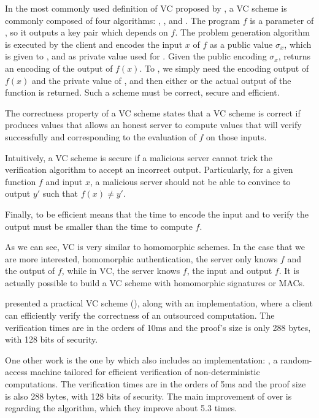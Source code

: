 In the most commonly used definition of VC proposed by
\textcite{eprint:2009:547}, a VC scheme is commonly composed of four
algorithms: \KeyGen, ,  and
. The program $f$ is a parameter of \KeyGen, so it outputs
a key pair which depends on $f$.  The problem generation algorithm
 is executed by the client and encodes the input $x$ of $f$
as a public value $\sigma_x$, which is given to , and as
private value used for .  Given the public encoding
$\sigma_x$,  returns an encoding of the output of $f(x)$. To
, we simply need the encoding output of $f(x)$ and the
private value of , and then either  or the
actual output of the function is returned. Such a scheme must be correct,
secure and efficient.

The correctness property of a VC scheme states that a VC scheme is correct if
 produces values that allows an honest server to compute
values that will verify successfully and corresponding to the evaluation of $f$
on those inputs.

Intuitively, a VC scheme is secure if a malicious server cannot trick the
verification algorithm to accept an incorrect output. Particularly, for a given
function $f$ and input $x$, a malicious server should not be able to convince
 to output $y'$ such that $f(x) \neq y'$.

Finally, to be efficient means that the time to encode the input and to verify
the output must be smaller than the time to compute $f$.

As we can see, VC is very similar to homomorphic schemes. In the case
that we are more interested, homomorphic authentication, the server only knows
$f$ and the output of $f$, while in VC, the server knows $f$, the input and
output $f$. It is actually possible to build a VC scheme with homomorphic
signatures or MACs.

\textcite{parno:howell:gentry:raykova:2013} presented a practical VC scheme
(), along with an implementation,
where a client can efficiently verify the correctness of an outsourced
computation. The verification times are in the orders of 10ms and the proof's
size is only 288 bytes, with 128 bits of security.

One other work is the one by \textcite{tinyram} which also includes an
implementation: , a random-access machine tailored for
efficient verification of non-deterministic computations. The verification times
are in the orders of 5ms and the proof size is also 288 bytes, with 128 bits of
security. The main improvement of  over
 is regarding the
 algorithm, which they improve about 5.3 times.

